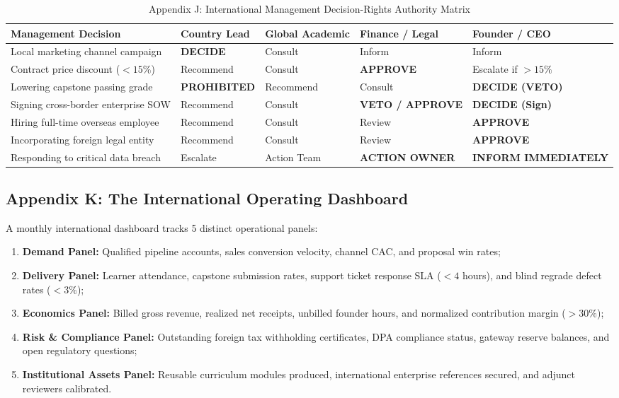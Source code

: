 \begin{table}[t]
\centering
\small
\caption{Appendix J: International Management Decision-Rights Authority Matrix}
\label{tab:app_decision_charter}
\begin{tabularx}{\textwidth}{p{4.2cm} p{2.2cm} p{2.8cm} p{2.4cm} X}
\toprule
\textbf{Management Decision} & \textbf{Country Lead} & \textbf{Global Academic} & \textbf{Finance / Legal} & \textbf{Founder / CEO} \\
\midrule
Local marketing channel campaign & \textbf{DECIDE} & Consult & Inform & Inform \\
Contract price discount ($<15\%$) & Recommend & Consult & \textbf{APPROVE} & Escalate if $>15\%$ \\
Lowering capstone passing grade & \textbf{PROHIBITED} & Recommend & Consult & \textbf{DECIDE (VETO)} \\
Signing cross-border enterprise SOW & Recommend & Consult & \textbf{VETO / APPROVE} & \textbf{DECIDE (Sign)} \\
Hiring full-time overseas employee & Recommend & Consult & Review & \textbf{APPROVE} \\
Incorporating foreign legal entity & Recommend & Consult & Review & \textbf{APPROVE} \\
Responding to critical data breach & Escalate & Action Team & \textbf{ACTION OWNER} & \textbf{INFORM IMMEDIATELY} \\
\bottomrule
\end{tabularx}
\end{table}

\subsection{Appendix K: The International Operating Dashboard}

A monthly international dashboard tracks 5 distinct operational panels:
\begin{enumerate}
    \item \textbf{Demand Panel:} Qualified pipeline accounts, sales conversion velocity, channel CAC, and proposal win rates;
    \item \textbf{Delivery Panel:} Learner attendance, capstone submission rates, support ticket response SLA ($<4$ hours), and blind regrade defect rates ($<3\%$);
    \item \textbf{Economics Panel:} Billed gross revenue, realized net receipts, unbilled founder hours, and normalized contribution margin ($>30\%$);
    \item \textbf{Risk \& Compliance Panel:} Outstanding foreign tax withholding certificates, DPA compliance status, gateway reserve balances, and open regulatory questions;
    \item \textbf{Institutional Assets Panel:} Reusable curriculum modules produced, international enterprise references secured, and adjunct reviewers calibrated.
\end{enumerate}

